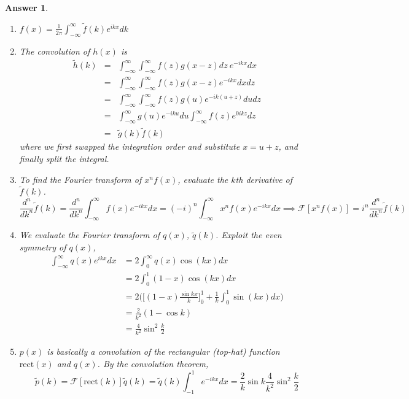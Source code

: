 \documentclass[a4paper]{article}
\newtheorem{ans}{Answer}[section]
\theoremstyle{new}
\begin{document}
\begin{ans}\leavevmode
\begin{enumerate}[label=(\alph*)]
\item $f(x)=\frac{1}{2\pi}\int_{-\infty}^\infty\tilde{f}(k)e^{ikx}dk$
\item The convolution of $h(x)$ is
\begin{eqnarray}
\tilde{h}(k)&=&\int_{-\infty}^\infty\int_{-\infty}^\infty f(z)g(x-z)dz~e^{-ikx}dx\nonumber\\&=&\int_{-\infty}^\infty\int_{-\infty}^\infty f(z)g(x-z)e^{-ikx}dxdz\nonumber\\&=&\int_{-\infty}^\infty\int_{-\infty}^\infty f(z)g(u)e^{-ik(u+z)}dudz\nonumber\\&=&\int_{-\infty}^\infty g(u)e^{-iku}du\int_{-\infty}^\infty f(z)e^{0ikz}dz\nonumber\\&=&\tilde{g}(k)\tilde{f}(k)\nonumber
\end{eqnarray}
where we first swapped the integration order and substitute $x=u+z$, and finally split the integral.
\item To find the Fourier transform of $x^nf(x)$, evaluate the $k$th derivative of $\tilde{f}(k)$.
$$\frac{d^n}{dk^n}\tilde{f}(k)=\frac{d^n}{dk^n}\int_{-\infty}^\infty f(x)e^{-ikx}dx=(-i)^n\int_{-\infty}^\infty x^nf(x)e^{-ikx}dx\implies\mathcal{F}[x^nf(x)]=i^n\frac{d^n}{dk^n}\tilde{f}(k)$$
\item We evaluate the Fourier transform of $q(x)$, $\tilde{q}(k)$. Exploit the even symmetry of $q(x)$,
\begin{align}
  \int_{-\infty}^\infty q(x)e^{ikx}dx&=2\int_0^\infty q(x)\cos(kx)dx\nonumber\\&=2\int_0^1(1-x)\cos(kx)dx\nonumber\\&=2\bigg(\bigg[(1-x)\frac{\sin kx}{k}\bigg]_0^1+\frac{1}{k}\int_0^1\sin(kx)dx\bigg)\nonumber\\&=\frac{2}{k^2}(1-\cos k)\nonumber\\&=\frac{4}{k^2}\sin^2\frac{k}{2}\nonumber  
\end{align}

\item $p(x)$ is basically a convolution of the rectangular (top-hat) function $\text{rect}(x)$ and $q(x)$. By the convolution theorem,
$$\tilde{p}(k)=\mathcal{F}[\text{rect}(k)]\tilde{q}(k)=\tilde{q}(k)\int_{-1}^1e^{-ikx}dx=\frac{2}{k}\sin k\frac{4}{k^2}\sin^2\frac{k}{2}$$
\end{enumerate}
\end{ans}
\newpage
\end{document}
